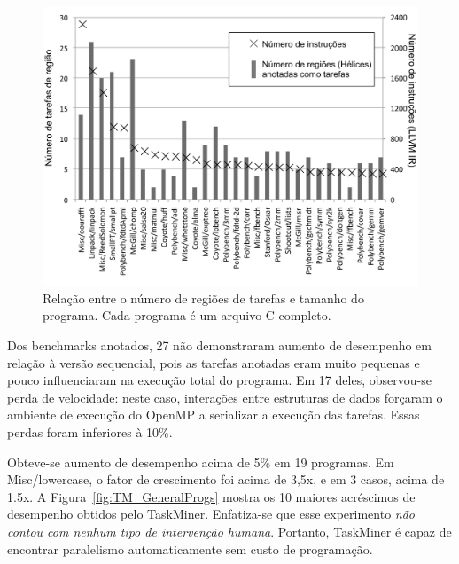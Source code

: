 \documentclass[sigplan,10pt]{acmart}
\newcommand\Taskminer{\mbox{\textsf{TaskMiner}}}
\begin{document}
\begin{figure}[htb]
\begin{center}
\includegraphics[width=1\columnwidth]{images/TM_Versatility}
\caption{Relação entre o número de regiões de tarefas e tamanho do programa.
Cada programa é um arquivo C completo.}
\label{fig:TM_Versatility}
\end{center}
\end{figure}

Dos benchmarks anotados, 27 não demonstraram aumento de desempenho em 
relação à versão sequencial,
pois as tarefas anotadas eram muito pequenas e pouco influenciaram na execução total do programa.
Em 17 deles, observou-se perda de velocidade: neste caso, interações entre estruturas de dados
forçaram o ambiente de execução do OpenMP a serializar a execução das tarefas. 
Essas perdas foram 
inferiores à 10\%. 

Obteve-se aumento de desempenho acima de 5\% em 19 programas. 
Em \textsf{Misc/lowercase}, o fator de crescimento foi acima de 3,5x, e em 3 casos, acima de 1.5x.
A Figura~\ref{fig:TM_GeneralProgs} mostra os 10 maiores acréscimos de desempenho obtidos pelo \Taskminer{}.
Enfatiza-se que esse experimento {\em não contou com nenhum tipo de intervenção humana}.
Portanto, \Taskminer{} é capaz de encontrar paralelismo automaticamente sem custo de programação.
\end{document}
